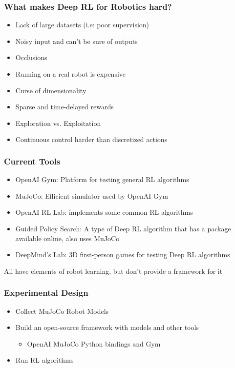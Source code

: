 \documentclass[12pt,handout]{beamer}
\begin{document}
\begin{frame}
    \frametitle{What makes Deep RL for Robotics hard?}
    \begin{itemize}
        \item{Lack of large datasets (i.e: poor supervision)}
        \item{Noisy input and can't be sure of outputs}
        \item{Occlusions}
        \item{Running on a real robot is expensive}
        \item{Curse of dimensionality}
        \item{Sparse and time-delayed rewards}
        \item{Exploration vs. Exploitation}
        \item{Continuous control harder than discretized actions}
    \end{itemize}
\end{frame}
\begin{frame}
    \frametitle{Current Tools}
    \begin{itemize}
        \item{OpenAI Gym: Platform for testing general RL algorithms}
        \item{MuJoCo: Efficient simulator used by OpenAI Gym}
        \item{OpenAI RL Lab: implements some common RL algorithms}
        \item{Guided Policy Search: A type of Deep RL algorithm that has a package available online, also uses MuJoCo}
        \item{DeepMind's Lab: 3D first-person games for testing Deep RL algorithms}
    \end{itemize}
    All have elements of robot learning, but don't provide a framework for it %
\end{frame}
\begin{frame}
    \frametitle{Experimental Design}
    \begin{itemize}
        \item{Collect MuJoCo Robot Models}
        \item{Build an open-source framework with models and other tools}
        \begin{itemize}
            \item{OpenAI MuJoCo Python bindings and Gym}
        \end{itemize}
        \item{Run RL algorithms}
    \end{itemize}
\end{frame}
\end{document}
